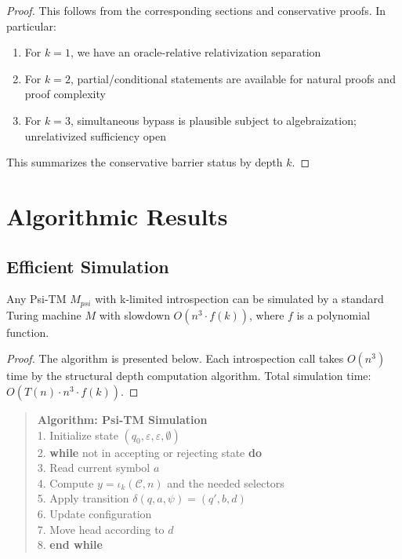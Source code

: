 \begin{proof}
This follows from the corresponding sections and conservative proofs. In particular:

\begin{enumerate}
\item For $k = 1$, we have an oracle-relative relativization separation
\item For $k = 2$, partial/conditional statements are available for natural proofs and proof complexity
\item For $k = 3$, simultaneous bypass is plausible subject to algebraization; unrelativized sufficiency open
\end{enumerate}

This summarizes the conservative barrier status by depth $k$.
\end{proof}

\section{Algorithmic Results}

\subsection{Efficient Simulation}

\begin{theorem}
Any Psi-TM $M_{psi}$ with k-limited introspection can be simulated by a standard Turing machine $M$ with slowdown $O(n^3 \cdot f(k))$, where $f$ is a polynomial function.
\end{theorem}

\begin{proof}
The algorithm is presented below. Each introspection call takes $O(n^3)$ time by the structural depth computation algorithm. Total simulation time: $O(T(n) \cdot n^3 \cdot f(k))$.
\end{proof}

\begin{quote}
\textbf{Algorithm: Psi-TM Simulation}\\[0.5em]
1. Initialize state $(q_0, \varepsilon, \varepsilon, \emptyset)$\\
2. \textbf{while} not in accepting or rejecting state \textbf{do}\\
3. \quad Read current symbol $a$\\
4. \quad Compute $y = \iota_k(\mathcal{C},n)$ and the needed selectors\\
5. \quad Apply transition $\delta(q, a, \psi) = (q', b, d)$\\
6. \quad Update configuration\\
7. \quad Move head according to $d$\\
8. \textbf{end while}
\end{quote}

